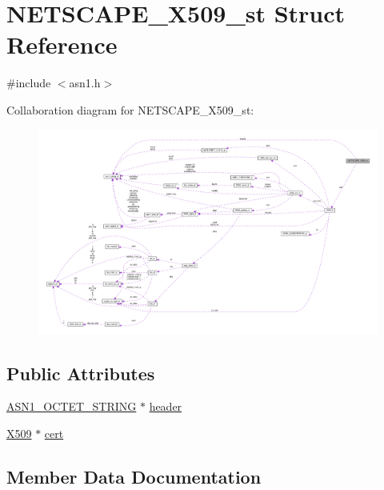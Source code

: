 \hypertarget{struct_n_e_t_s_c_a_p_e___x509__st}{}\section{N\+E\+T\+S\+C\+A\+P\+E\+\_\+\+X509\+\_\+st Struct Reference}
\label{struct_n_e_t_s_c_a_p_e___x509__st}


{\ttfamily \#include $<$asn1.\+h$>$}



Collaboration diagram for N\+E\+T\+S\+C\+A\+P\+E\+\_\+\+X509\+\_\+st\+:
\nopagebreak
\begin{figure}[H]
\begin{center}
\leavevmode
\includegraphics[width=350pt]{struct_n_e_t_s_c_a_p_e___x509__st__coll__graph}
\end{center}
\end{figure}
\subsection*{Public Attributes}
\begin{DoxyCompactItemize}
\item 
\hyperlink{ossl__typ_8h_afbd05e94e0f0430a2b729473efec88c1}{A\+S\+N1\+\_\+\+O\+C\+T\+E\+T\+\_\+\+S\+T\+R\+I\+NG} $\ast$ \hyperlink{struct_n_e_t_s_c_a_p_e___x509__st_a00f5f31a882f9ee420d1a3bd2beebedd}{header}
\item 
\hyperlink{ossl__typ_8h_a4f666bde6518f95deb3050c54b408416}{X509} $\ast$ \hyperlink{struct_n_e_t_s_c_a_p_e___x509__st_ae73d9f6791b788f7c724b89f715d3d76}{cert}
\end{DoxyCompactItemize}


\subsection{Member Data Documentation}
